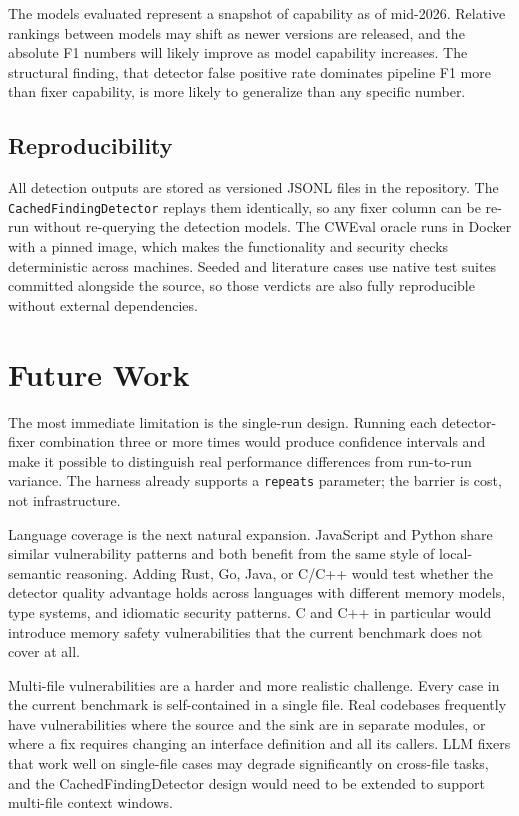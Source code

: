 \documentclass[12pt]{article}
\begin{document}
The models evaluated represent a snapshot of capability as of mid-2026.
Relative rankings between models may shift as newer versions are released,
and the absolute F1 numbers will likely improve as model capability increases.
The structural finding, that detector false positive rate dominates pipeline
F1 more than fixer capability, is more likely to generalize than any
specific number.

\subsection{Reproducibility}

All detection outputs are stored as versioned JSONL files in the repository.
The \texttt{CachedFindingDetector} replays them identically, so any fixer
column can be re-run without re-querying the detection models. The CWEval
oracle runs in Docker with a pinned image, which makes the functionality and
security checks deterministic across machines. Seeded and literature cases
use native test suites committed alongside the source, so those verdicts are
also fully reproducible without external dependencies.

\section{Future Work}
\label{sec:future}

The most immediate limitation is the single-run design. Running each
detector-fixer combination three or more times would produce confidence
intervals and make it possible to distinguish real performance differences
from run-to-run variance. The harness already supports a \texttt{repeats}
parameter; the barrier is cost, not infrastructure.

Language coverage is the next natural expansion. JavaScript and Python share
similar vulnerability patterns and both benefit from the same style of
local-semantic reasoning. Adding Rust, Go, Java, or C/C++ would test whether
the detector quality advantage holds across languages with different memory
models, type systems, and idiomatic security patterns. C and C++ in particular
would introduce memory safety vulnerabilities that the current benchmark does
not cover at all.

Multi-file vulnerabilities are a harder and more realistic challenge. Every
case in the current benchmark is self-contained in a single file. Real
codebases frequently have vulnerabilities where the source and the sink are in
separate modules, or where a fix requires changing an interface definition and
all its callers. LLM fixers that work well on single-file cases may degrade
significantly on cross-file tasks, and the CachedFindingDetector design would
need to be extended to support multi-file context windows.
\end{document}
